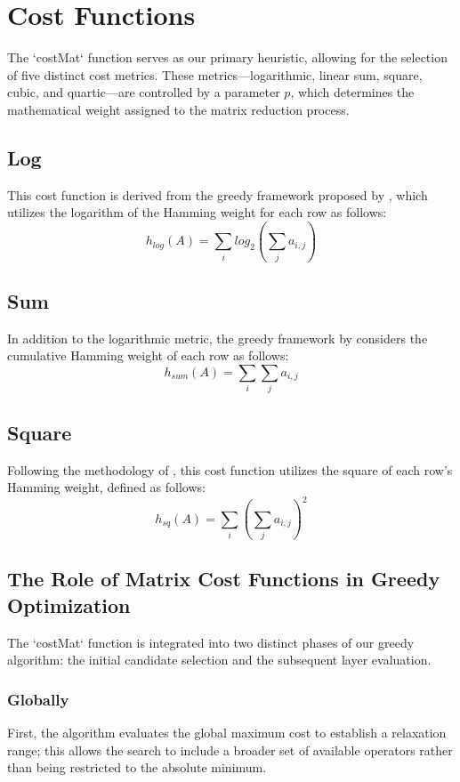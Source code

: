 \chapter{Cost Functions}
The `costMat` function serves as our primary heuristic, allowing for the selection of five distinct cost metrics. These metrics—logarithmic, linear sum, square, cubic, and quartic—are controlled by a parameter $p$, which determines the mathematical weight assigned to the matrix reduction process.

\section{Log}
This cost function is derived from the greedy framework proposed by \cite{9475957}, which utilizes the logarithm of the Hamming weight for each row as follows:
$$h_{log}(A) = \sum_{i}log_{2}(\sum_{j}a_{i,j})$$

\section{Sum}
In addition to the logarithmic metric, the greedy framework by \cite{9475957} considers the cumulative Hamming weight of each row as follows:
$$h_{sum}(A) = \sum_{i}\sum_{j}a_{i,j}$$

\section{Square}
Following the methodology of \cite{cryptoeprint:2024/381}, this cost function utilizes the square of each row's Hamming weight, defined as follows:
$$h_{sq}(A) = \sum_{i}(\sum_{j}a_{i,j})^{2}$$

\section{The Role of Matrix Cost Functions in Greedy Optimization}
The `costMat` function is integrated into two distinct phases of our greedy algorithm: the initial candidate selection and the subsequent layer evaluation.

\subsection{Globally}
First, the algorithm evaluates the global maximum cost to establish a relaxation range; this allows the search to include a broader set of available operators rather than being restricted to the absolute minimum.

